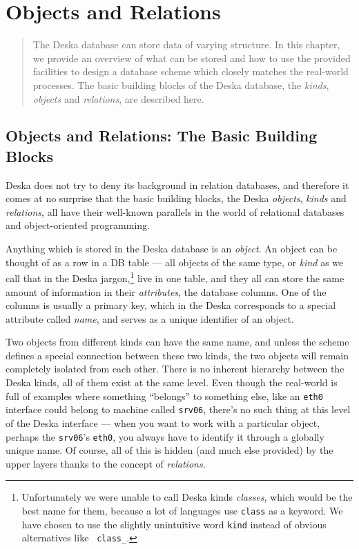 \documentclass[deska]{subfiles}
\begin{document}
\chapter{Objects and Relations}

\begin{abstract}
The Deska database can store data of varying structure.  In this chapter, we provide an overview of what can be stored
and how to use the provided facilities to design a database scheme which closely matches the real-world processes.  The
basic building blocks of the Deska database, the {\em kinds}, {\em objects} and {\em relations}, are described here.
\end{abstract}

\section{Objects and Relations: The Basic Building Blocks}
\label{sec:objects-and-relations}

Deska does not try to deny its background in relation databases, and therefore it comes at no surprise that the basic
building blocks, the Deska {\em objects}, {\em kinds} and {\em relations}, all have their well-known parallels in the
world of relational databases and object-oriented programming.

Anything which is stored in the Deska database is an {\em object}. An object can be thought of as a row in a DB table ---
all objects of the same type, or {\em kind} as we call that in the Deska jargon,\footnote{Unfortunately we were unable
to call Deska kinds {\em classes}, which would be the best name for them, because a lot of languages use {\tt class} as
a keyword.  We have chosen to use the slightly unintuitive word {\tt kind} instead of obvious alternatives like {\tt
class\_}.} live in one table, and they all can
store the same amount of information in their {\em attributes}, the database columns.  One of the columns is usually a
primary key, which in the Deska corresponds to a special attribute called {\em name}, and serves as a unique identifier
of an object.

Two objects from different kinds can have the same name, and unless the scheme defines a special connection between
these two kinds, the two objects will remain completely isolated from each other.  There is no inherent hierarchy
between the Deska kinds, all of them exist at the same level.  Even though the real-world is full of examples where
something ``belongs'' to something else, like an {\tt eth0} interface could belong to machine called {\tt srv06},
there's no such thing at this level of the Deska interface --- when you want to work with a particular object, perhaps
the {\tt srv06}'s {\tt eth0}, you always have to identify it through a globally unique name.  Of course, all of this is
hidden (and much else provided) by the upper layers thanks to the concept of {\em relations}.
\end{document}
